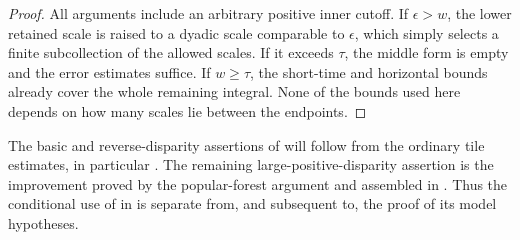 \begin{proof}
All arguments include an arbitrary positive inner cutoff. If
\(\epsilon>w\), the lower retained scale is raised to a dyadic
scale comparable to \(\epsilon\), which simply selects a finite
subcollection of the allowed scales. If it exceeds \(\tau\),
the middle form is empty and the error estimates suffice. If
\(w\ge\tau\), the short-time and horizontal bounds already
cover the whole remaining integral. None of the bounds used here
depends on how many scales lie between the endpoints.
\end{proof}

The basic and reverse-disparity assertions of
 will follow from the ordinary tile
estimates, in particular . The remaining
large-positive-disparity assertion is the improvement proved by the
popular-forest argument and assembled in
. Thus the conditional use of
 in  is
separate from, and subsequent to, the proof of its model hypotheses.
